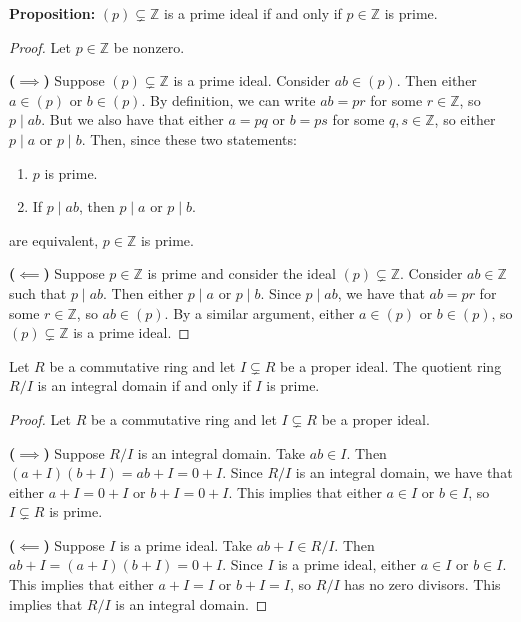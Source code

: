 \documentclass [12pt]{article}
\newcommand{\Z}{\mathbb{Z}}
\newcounter{thmcounter}[section]
\renewcommand{\thethmcounter}{\thesection.\arabic{thmcounter}}
\newenvironment{theorem}[1]{
  \refstepcounter{thmcounter}
  \begin{tcolorbox}[title={Theorem \thethmcounter: #1}, colback=green!5!white, colframe=black!75!green]
}{ \end{tcolorbox} }
\renewcommand{\bf}[1]{\textbf{{#1}}}
\begin{document}
\bf{Proposition:} $(p) \subsetneq \Z$ is a prime ideal if and only if $p \in \Z$ is prime.
\begin{proof}
    Let $p \in \Z$ be nonzero.
    \vspace{0.5em}

    \bf{($\bm{\implies}$)}
    Suppose $(p) \subsetneq \Z$ is a prime ideal. Consider $ab \in (p)$. Then either $a \in (p)$ or
    $b \in (p)$. By definition, we can write $ab = pr$ for some $r \in \Z$, so $p \mid ab$. But we
    also have that either $a = pq$ or $b = ps$ for some $q, s \in \Z$, so either $p \mid a$ or
    $p \mid b$. Then, since these two statements:
    \begin{enumerate}[label=(\arabic*)]
        \item $p$ is prime.
        \item If $p \mid ab$, then $p \mid a$ or $p \mid b$.
    \end{enumerate}
    are equivalent, $p \in \Z$ is prime.
    \vspace{0.5em}

    \bf{($\bm{\impliedby}$)}
    Suppose $p \in \Z$ is prime and consider the ideal $(p) \subsetneq \Z$. Consider $ab \in \Z$
    such that $p \mid ab$. Then either $p \mid a$ or $p \mid b$. Since $p \mid ab$, we have that
    $ab = pr$ for some $r \in \Z$, so $ab \in (p)$. By a similar argument, either $a \in (p)$ or
    $b \in (p)$, so $(p) \subsetneq \Z$ is a prime ideal.
\end{proof}

\begin{theorem}{}
    Let $R$ be a commutative ring and let $I \subsetneq R$ be a proper ideal. The quotient ring
    $R/I$ is an integral domain if and only if $I$ is prime.
\end{theorem}
\begin{proof}
    Let $R$ be a commutative ring and let $I \subsetneq R$ be a proper ideal.
    \vspace{0.5em}

    \bf{($\bm{\implies}$)}
    Suppose $R/I$ is an integral domain. Take $ab \in I$. Then $(a + I)(b + I) = ab + I = 0 + I$.
    Since $R/I$ is an integral domain, we have that either $a + I = 0 + I$ or $b + I = 0 + I$. This
    implies that either $a \in I$ or $b \in I$, so $I \subsetneq R$ is prime.
    \vspace{0.5em}

    \bf{($\bm{\impliedby}$)}
    Suppose $I$ is a prime ideal. Take $ab + I \in R/I$. Then $ab + I = (a + I)(b + I) = 0 + I$.
    Since $I$ is a prime ideal, either $a \in I$ or $b \in I$. This implies that either $a + I = I$ or
    $b + I = I$, so $R/I$ has no zero divisors. This implies that $R/I$ is an integral domain.
\end{proof}
\end{document}
